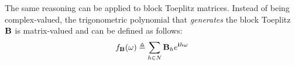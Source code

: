 {%

The same reasoning can be applied to block Toeplitz matrices. Instead of being complex-valued, the trigonometric polynomial that {\em generates} the block Toeplitz $\mathbf{B}$ is matrix-valued and can be defined as follows:
\begin{equation}
  f_{\mathbf{B}}(\omega) \triangleq \sum_{h \in N} \mathbf{B}_h e^{\mathbf{i} h \omega}
\end{equation}

}
